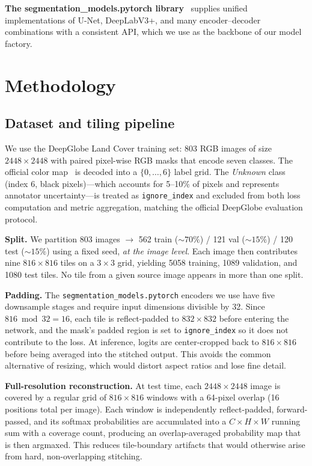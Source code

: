 \documentclass[conference,letterpaper,10pt]{IEEEtran}
\begin{document}
\textbf{The segmentation\_models.pytorch library}~\cite{iakubovskii2019smp}
supplies unified implementations of U-Net, DeepLabV3+, and many
encoder--decoder combinations with a consistent API, which we use as the
backbone of our model factory.

\section{Methodology}\label{sec:method}

\subsection{Dataset and tiling pipeline}

We use the DeepGlobe Land Cover training set: 803 RGB images of size
$2448\times2448$ with paired pixel-wise RGB masks that encode seven classes.
The official color map~\cite{demir2018deepglobe} is decoded into a
$\{0,\dots,6\}$ label grid. The \emph{Unknown} class (index 6, black
pixels)---which accounts for 5--10\% of pixels and represents annotator
uncertainty---is treated as \texttt{ignore\_index} and excluded from both
loss computation and metric aggregation, matching the official DeepGlobe
evaluation protocol.

\textbf{Split.} We partition 803 images $\rightarrow$ 562 train
($\sim70\%$) / 121 val ($\sim15\%$) / 120 test ($\sim15\%$) using a fixed
seed, \emph{at the image level}. Each image then contributes nine
$816\times816$ tiles on a $3\times3$ grid, yielding 5058 training, 1089
validation, and 1080 test tiles. No tile from a given source image appears
in more than one split.

\textbf{Padding.} The \texttt{segmentation\_models.pytorch} encoders we use
have five downsample stages and require input dimensions divisible by 32.
Since $816\bmod 32=16$, each tile is reflect-padded to $832\times832$ before
entering the network, and the mask's padded region is set to
\texttt{ignore\_index} so it does not contribute to the loss. At inference,
logits are center-cropped back to $816\times816$ before being averaged into
the stitched output. This avoids the common alternative of resizing, which
would distort aspect ratios and lose fine detail.

\textbf{Full-resolution reconstruction.} At test time, each
$2448\times2448$ image is covered by a regular grid of $816\times816$
windows with a 64-pixel overlap (16 positions total per image). Each window
is independently reflect-padded, forward-passed, and its softmax
probabilities are accumulated into a $C\times H\times W$ running sum with a
coverage count, producing an overlap-averaged probability map that is then
argmaxed. This reduces tile-boundary artifacts that would otherwise arise
from hard, non-overlapping stitching.
\end{document}
